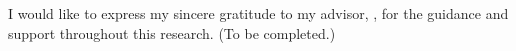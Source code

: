 \begin{Thanks}
    I would like to express my sincere gratitude to my advisor, \advisorEname, for the guidance and support throughout this research. (To be completed.)
\end{Thanks}
